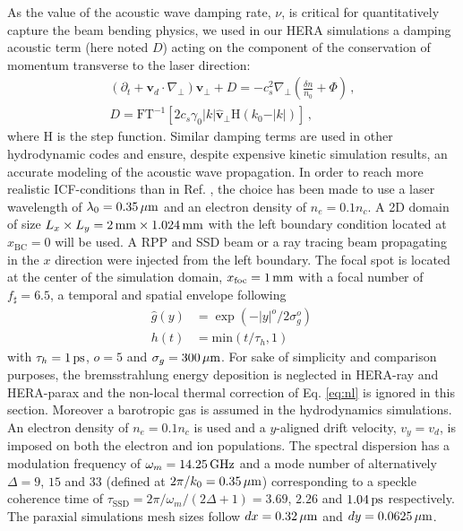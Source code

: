 \documentclass[%
 reprint,
 amsmath,amssymb,
 aps,
]{revtex4-1}
\begin{document}
As the value of the acoustic wave damping rate, $\nu$,  is critical for quantitatively capture the beam bending physics, we used in our HERA simulations a damping acoustic term (here noted $D$) acting on the component of the conservation of momentum  transverse to the laser direction: 
\begin{align}
(\partial_t + \mathbf{v}_d\cdot \nabla_\perp) \mathbf{v}_\perp + D  = - c_s^2\nabla_\perp\left(\frac{  \delta n }{n_0} +  \Phi  \right) \, ,\label{eq:hydro2} \\
D=  \mathrm{FT}^{-1}\left[ 2 c_s  \gamma_0 \vert k \vert   \hat{\mathbf{v}}_\perp  \mathrm{H}( k_0 - \vert k \vert )\right]\, ,
\end{align}
where $\mathrm{H}$ is the step function. Similar damping terms are used in other hydrodynamic codes \cite{phd-PEML,Masson_2006,Huller_2008} and ensure, despite expensive kinetic simulation results,  an accurate modeling of the acoustic wave propagation. 
In order to reach more realistic ICF-conditions than in Ref. \cite[]{POP_Ruyer_2020}, the choice has been made to use a laser wavelength of $\lambda_0=0.35\, \rm\mu m$  and  an electron density of $n_e = 0.1n_c$.
A 2D domain of size  $L_x\times L_y = 2\, \rm{mm} \times 1.024 \, \rm{mm}$ with the left boundary condition located at $x_\mathrm{BC}=0$ will be used. 
A RPP and SSD beam  or a ray tracing beam propagating in the $x$ direction were injected from the left boundary.
The focal spot is located at the center of the simulation domain, $x_\mathrm{foc}=1\, \rm mm$ with a focal number of $f_\sharp = 6.5$, a temporal
and spatial envelope following
\begin{align}
    \hat{g}(y) &= \exp(-\vert y\vert ^o/2\sigma_g^o)  \,  \label{eq:g}\\
    h(t) &= \mathrm{min}(t/\tau_h,1) \,\label{eq:h}
\end{align}
with $\tau_h=1\, \rm ps$,  $o=5$ and $\sigma_g = 300\,\rm \mu m$. 
For sake of simplicity and comparison purposes, the bremsstrahlung energy deposition is neglected in HERA-ray and HERA-parax and the non-local thermal correction of Eq. \eqref{eq:nl} is ignored in this section.  
Moreover a barotropic gas is assumed in the hydrodynamics simulations.  An electron density of $n_e =0.1n_c $ is used  and a $y$-aligned drift velocity, $v_y=v_d$, is imposed on both the electron and ion populations.
The  spectral dispersion  has a modulation frequency of  $\omega_m = 14.25\,\rm GHz$ and a mode number of alternatively $
\Delta = 9$, $15$ and $33$ (defined at $2\pi/k_0=0.35\,\rm\mu m$) corresponding to a speckle coherence time of 
$\tau_\mathrm{SSD} =2\pi/\omega_m/(2\Delta+1) =3.69$, $2.26$ and  $1.04 \,\rm ps$ respectively. 
The paraxial simulations mesh sizes follow $dx = 0.32\, \rm \mu m$ and $dy =0.0625\, \rm \mu m$. 
\end{document}
